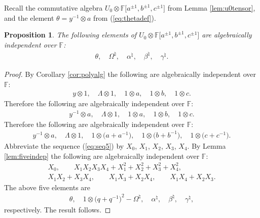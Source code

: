\documentclass[11pt]{article}
\numberwithin{equation}{section}
\newtheorem{Proposition}[Theorem]{Proposition}
{\theoremstyle{definition}
\newtheorem{Note}[Theorem]{Note}
\newtheorem{Definition}[Theorem]{Definition}
\newtheorem{Problem}[Theorem]{Problem}
}
\begin{document}
Recall the commutative algebra
$U_0\otimes
\mathbb F \lbrack a^{\pm 1}, b^{\pm 1}, c^{\pm 1}\rbrack $
from
Lemma \ref{lem:u0tensor}, and the element
$\theta = y^{-1}\otimes a$ from
(\ref{eq:thetadef}).


\begin{Proposition}
\label{lem:algind}
The following elements of
$U_0\otimes
\mathbb F \lbrack a^{\pm 1}, b^{\pm 1}, c^{\pm 1}\rbrack $
are algebraically independent over $\mathbb F$:
\begin{gather*}
\theta, \quad \Omega^\natural,
\quad
\alpha^\natural,
\quad
\beta^\natural,
\quad
\gamma^\natural.
\end{gather*}
\end{Proposition}
\begin{proof}
By
 Corollary
\ref{cor:polyalg} the following are algebraically independent over
$\mathbb F$:
\begin{gather*}
y \otimes 1, \quad
\Lambda \otimes 1,
\quad
1 \otimes a,
\quad
1 \otimes b,
\quad
1 \otimes c.
\end{gather*}
Therefore the following are
algebraically independent over
$\mathbb F$:
\begin{gather*}
y^{-1} \otimes a, \quad
\Lambda \otimes 1,
\quad
1 \otimes a,
\quad
1 \otimes b,
\quad
1 \otimes c.
\end{gather*}
Therefore the following are
algebraically independent over
$\mathbb F$:
\begin{gather}
y^{-1} \otimes a, \quad
\Lambda \otimes 1,
\quad
1 \otimes \big(a+a^{-1}\big),
\quad
1 \otimes \big(b+b^{-1}\big),
\quad
1 \otimes \big(c+c^{-1}\big).
\label{eq:seq5}
\end{gather}
Abbreviate the sequence
(\ref{eq:seq5})
by
$X_0$, $X_1$, $X_2$, $X_3$, $X_4$.
By
Lemma
\ref{lem:fiveindep}
the following are
algebraically independent over
$\mathbb F$:
\begin{gather*}
 X_0,
\qquad
X_1X_2X_3X_4
+X_1^2+X_2^2+X_3^2+X_4^2,
\\
 X_1X_2+X_3X_4,
\qquad
 X_1X_3+X_2X_4,
\qquad
 X_1X_4+X_2X_3.
\end{gather*}
The
above f\/ive elements are
\begin{gather*}
\theta,
 \quad
 1\otimes \big(q+q^{-1}\big)^2 -
 \Omega^\natural,
\quad
\alpha^\natural,
\quad
\beta^\natural,
\quad
\gamma^\natural,
\end{gather*}
respectively. The result follows.
\end{proof}
\end{document}
